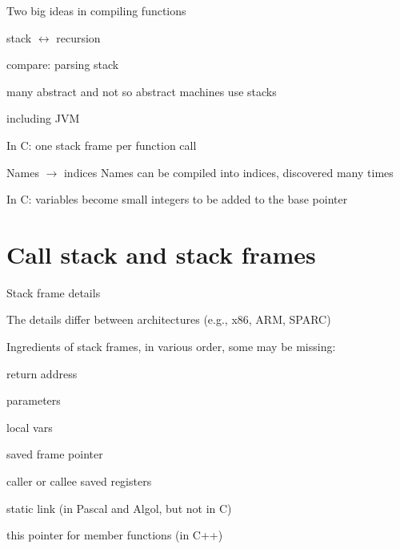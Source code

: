 \documentclass[landscape]{beamer}
\begin{document}
\begin{frame}{Two big ideas in compiling functions}

\begin{block}{stack $\leftrightarrow$ recursion}

compare: parsing stack

many abstract and not so abstract machines use stacks

including JVM

In C: one stack frame per function call
\end{block}

\begin{block}{Names $\to$ indices}
Names can be compiled into indices, discovered many times

%

In C: variables become small integers to be added to the base pointer

\end{block}

\end{frame}

\section{Call stack and stack frames}

\begin{frame}[fragile]{Stack frame details}

The details differ between architectures (e.g., x86, ARM, SPARC)

Ingredients of stack frames, in various order, some may be missing:

return address 

parameters

local vars

saved frame pointer

caller or callee saved registers

static link (in Pascal and Algol, but not in C)

this pointer for member functions (in C++)
\end{frame}
\end{document}
